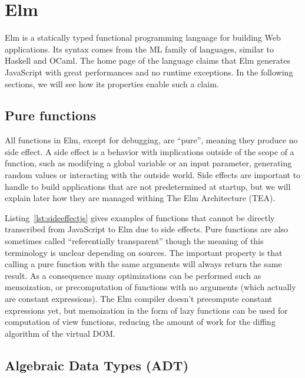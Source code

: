 \section{Elm}%
\label{sec:elm}

Elm is a statically typed functional programming language for building Web applications.
Its syntax comes from the ML family of languages, similar to Haskell and OCaml.
The home page of the language claims that Elm generates JavaScript
with great performances and no runtime exceptions.
In the following sections, we will see how its properties enable such a claim.

\subsection{Pure functions}%
\label{sub:pure_functions}

All functions in Elm, except for debugging, are ``pure'',
meaning they produce no side effect.
A side effect is a behavior with implications outside of the scope of a function,
such as modifying a global variable or an input parameter,
generating random values or interacting with the outside world.
Side effects are important to handle to build applications that are not predetermined
at startup, but we will explain later how they are managed withing The Elm Architecture (TEA).

Listing~\ref{lst:sideeffectjs} gives examples of functions that cannot be directly
transcribed from JavaScript to Elm due to side effects.
Pure functions are also sometimes called ``referentially transparent''
though the meaning of this terminology is unclear depending on sources.
The important property is that calling a pure function with the same arguments
will always return the same result.
As a consequence many optimizations can be performed such as memoization,
or precomputation of functions with no arguments (which actually are constant expressions).
The Elm compiler doesn't precompute constant expressions yet,
but memoization in the form of lazy functions can be used for computation
of view functions, reducing the amount of work for the diffing algorithm
of the virtual DOM.\@




\subsection{Algebraic Data Types (ADT)}%
\label{sub:algebraic_data_types_adt_}

